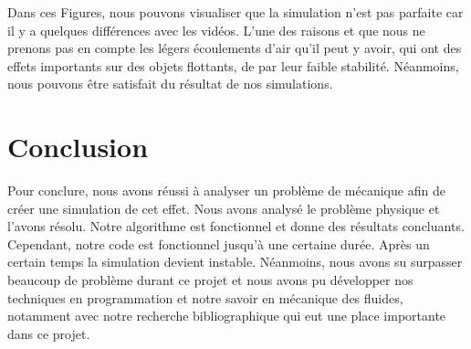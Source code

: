     Dans ces Figures, nous pouvons visualiser que la simulation n'est pas parfaite car il y a quelques différences avec les vidéos. L'une des raisons et que nous ne prenons pas en compte les légers écoulements d'air qu'il peut y avoir, qui ont des effets importants sur des objets flottants, de par leur faible stabilité. Néanmoins, nous pouvons être satisfait du résultat de nos simulations.
    
\section*{Conclusion}
    Pour conclure, nous avons réussi à analyser un problème de mécanique afin de créer une simulation de cet effet. Nous avons analysé le problème physique et l'avons résolu. Notre algorithme est fonctionnel et donne des résultats concluants. Cependant, notre code est fonctionnel jusqu'à une certaine durée. Après un certain temps la simulation devient instable. Néanmoins, nous avons su surpasser beaucoup de problème durant ce projet et nous avons pu développer nos techniques en programmation et notre savoir en mécanique des fluides, notamment avec notre recherche bibliographique qui eut une place importante dans ce projet. 


